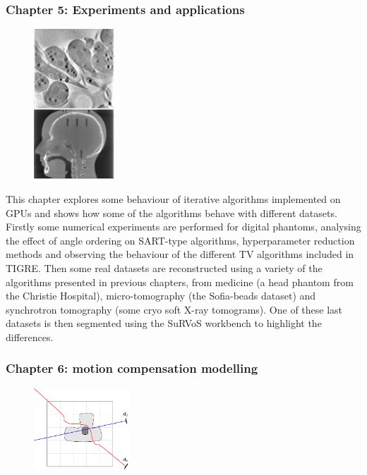 \newpage
\subsubsection{Chapter 5: Experiments and applications}

\begin{figure}
\centering
\includegraphics[width=0.27\textwidth]{Applications/thumnail.png}
\end{figure}

This chapter explores some behaviour of iterative algorithms implemented on GPUs and shows how some of the algorithms behave with different datasets. Firstly some numerical experiments are performed for digital phantoms, analysing the effect of angle ordering on SART-type algorithms, hyperparameter reduction methods and observing the behaviour of the different TV algorithms included in TIGRE. Then some real datasets are reconstructed using a variety of the algorithms presented in previous chapters, from medicine (a head phantom from the Christie Hospital), micro-tomography (the Sofia-beads dataset) and synchrotron tomography (some cryo soft X-ray tomograms). One of these last datasets is then segmented using the {SuRVoS} workbench to highlight the differences.


\FloatBarrier
\subsubsection{Chapter 6: motion compensation modelling}

\begin{figure}
\centering
\includegraphics[width=0.32\textwidth]{MotionCorrection/diagrammotion1.pdf}
\end{figure}

